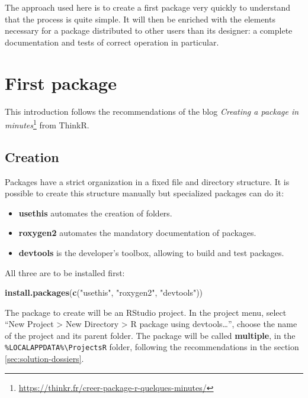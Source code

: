 \documentclass[
  12pt,
  american,
  a4paper,
  extrafontsizes,onecolumn,openright
  ]{memoir}
\newenvironment{Shaded}{\begin{snugshade}}{\end{snugshade}}
\newcommand{\FunctionTok}[1]{\textcolor[rgb]{0.13,0.29,0.53}{\textbf{#1}}}
\newcommand{\NormalTok}[1]{#1}
\newcommand{\StringTok}[1]{\textcolor[rgb]{0.31,0.60,0.02}{#1}}
\providecommand{\tightlist}{%
  \setlength{\itemsep}{0pt}\setlength{\parskip}{0pt}}
\begin{document}
The approach used here is to create a first package very quickly to understand that the process is quite simple.
It will then be enriched with the elements necessary for a package distributed to other users than its designer: a complete documentation and tests of correct operation in particular.

\section{First package}\label{first-package}

This introduction follows the recommendations of the blog \emph{Creating a package in minutes}\footnote{\url{https://thinkr.fr/creer-package-r-quelques-minutes/}} from ThinkR.

\subsection{Creation}\label{creation}

Packages have a strict organization in a fixed file and directory structure.
It is possible to create this structure manually but specialized packages can do it:

\begin{itemize}
\tightlist
\item
  \textbf{usethis} automates the creation of folders.
\item
  \textbf{roxygen2} automates the mandatory documentation of packages.
\item
  \textbf{devtools} is the developer's toolbox, allowing to build and test packages.
\end{itemize}

All three are to be installed first:

\scriptsize

\begin{Shaded}
\begin{Highlighting}[]
\FunctionTok{install.packages}\NormalTok{(}\FunctionTok{c}\NormalTok{(}\StringTok{"usethis"}\NormalTok{, }\StringTok{"roxygen2"}\NormalTok{, }\StringTok{"devtools"}\NormalTok{))}
\end{Highlighting}
\end{Shaded}

\normalsize

The package to create will be an RStudio project.
In the project menu, select \enquote{New Project \textgreater{} New Directory \textgreater{} R package using devtools\ldots{}}, choose the name of the project and its parent folder.
The package will be called \textbf{multiple}, in the \texttt{\%LOCALAPPDATA\%\textbackslash{}ProjectsR} folder, following the recommendations in the section \ref{sec:solution-dossiers}.
\end{document}
